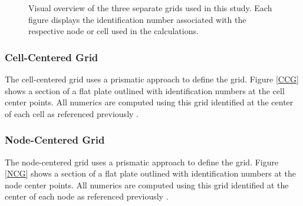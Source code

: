 \documentclass[final]{aiaa-pretty}
\begin{document}
\begin{figure}[h!] %
\centering
{}
\label{GridReps}
\caption{Visual overview of the three separate grids used in this study.  Each figure displays the identification number associated with the respective node or cell used in the calculations.}
\end{figure}




 \subsubsection{Cell-Centered Grid}
The cell-centered grid uses a prismatic approach to define the grid.  Figure \ref{CCG} shows a section of a flat plate outlined with identification numbers at the cell center points.  All numerics are computed using this grid identified at the center of each cell as referenced previously \cite{Katz2015}.  

 \subsubsection{Node-Centered Grid}
The node-centered grid uses a prismatic approach to define the grid.  Figure \ref{NCG} shows a section of a flat plate outlined with identification numbers at the node center points.  All numerics are computed using this grid identified at the center of each node as referenced previously \cite{Katz2015}.
\end{document}

